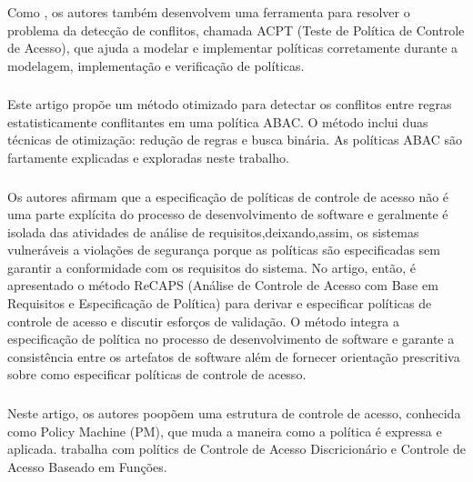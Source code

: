\subsubsection{}
Como , os autores também desenvolvem uma ferramenta para resolver o problema da detecção de conflitos, chamada  ACPT (Teste de Política de Controle de Acesso), que ajuda a modelar e implementar políticas corretamente durante a modelagem, implementação e verificação de políticas.

\subsubsection{}
Este artigo propõe um método otimizado para detectar os conflitos entre regras estatisticamente conflitantes em uma política ABAC. O método inclui duas técnicas de otimização: redução de regras e busca binária. As políticas ABAC são fartamente explicadas e exploradas neste trabalho.

\subsubsection{ }
Os autores afirmam que a especificação de políticas de controle de acesso não é uma parte explícita do processo de desenvolvimento de software e geralmente é isolada das atividades de análise de requisitos,deixando,assim, os sistemas vulneráveis ​​a violações de segurança porque as políticas são especificadas sem garantir a conformidade com os requisitos do sistema. No artigo, então, é apresentado o método ReCAPS (Análise de Controle de Acesso com Base em Requisitos e Especificação de Política) para derivar e especificar políticas de controle de acesso e discutir esforços de validação. O método integra a especificação de política no processo de desenvolvimento de software e garante a consistência entre os artefatos de software além de fornecer orientação prescritiva sobre como especificar políticas de controle de acesso.

\subsubsection{}
Neste artigo, os autores poopõem uma estrutura de controle de acesso, conhecida como Policy Machine (PM), que muda a maneira como a política é expressa e aplicada. trabalha com polítics de Controle de Acesso Discricionário e Controle de Acesso Baseado em Funções.

